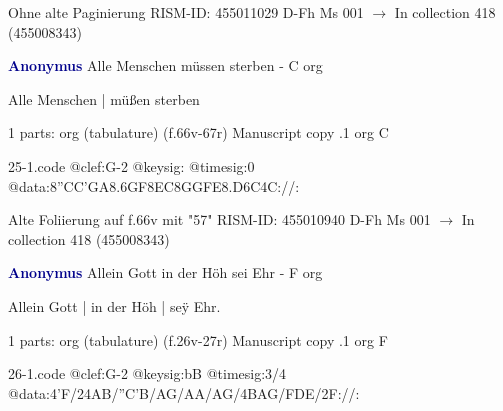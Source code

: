 \documentclass[twocolumn]{book}
\begin{document}
\newline Ohne alte Paginierung
\newline RISM-ID: 455011029
\newline D-Fh  Ms 001
\newline $\rightarrow$ In collection 418 (455008343)
      
\newline \par \vspace{7pt} \textcolor{darkblue}{\textbf{Anonymus  }}
\newline Alle Menschen müssen sterben - C
\newline org
\newline \begin{itshape}[f.66v, at left:] Alle Menschen | müßen sterben\end{itshape} 
\newline \textcolor{darkblue}{}  1 parts: org (tabulature)  (f.66v-67r)
\newline Manuscript copy
.1  org  C  
\begin{filecontents*}{25-1.code}
@clef:G-2
@keysig:
@timesig:0
@data:{8''CC'GA}{8.6GF8EC}{8GGFE}{8.D6C}4C://:
\end{filecontents*}
\newline
%

\newline Alte Foliierung auf f.66v mit "57"
\newline RISM-ID: 455010940
\newline D-Fh  Ms 001
\newline $\rightarrow$ In collection 418 (455008343)
      
\newline \par \vspace{7pt} \textcolor{darkblue}{\textbf{Anonymus  }}
\newline Allein Gott in der Höh sei Ehr - F
\newline org
\newline \begin{itshape}[f.26v, at left:] Allein Gott | in der Höh | seÿ Ehr.\end{itshape} 
\newline \textcolor{darkblue}{}  1 parts: org (tabulature)  (f.26v-27r)
\newline Manuscript copy
.1  org  F  
\begin{filecontents*}{26-1.code}
@clef:G-2
@keysig:bB
@timesig:3/4
@data:4'F/24AB/''C'B/AG/AA/AG/4BAG/FDE/2F://:
\end{filecontents*}
\newline
%
\end{document}
